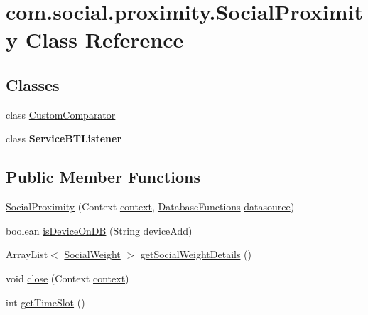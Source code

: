 \hypertarget{classcom_1_1social_1_1proximity_1_1_social_proximity}{}\section{com.\+social.\+proximity.\+Social\+Proximity Class Reference}
\label{classcom_1_1social_1_1proximity_1_1_social_proximity}
\subsection*{Classes}
\begin{DoxyCompactItemize}
\item 
class \hyperlink{classcom_1_1social_1_1proximity_1_1_social_proximity_1_1_custom_comparator}{Custom\+Comparator}
\item 
class {\bfseries Service\+B\+T\+Listener}
\end{DoxyCompactItemize}
\subsection*{Public Member Functions}
\begin{DoxyCompactItemize}
\item 
\hyperlink{classcom_1_1social_1_1proximity_1_1_social_proximity_aca9e6f96e31a9714fed5967a7710ad1e}{Social\+Proximity} (Context \hyperlink{classcom_1_1social_1_1proximity_1_1_social_proximity_a094349a2f8b31f6f13353abec962f0a4}{context}, \hyperlink{classcom_1_1social_1_1proximity_1_1_database_functions}{Database\+Functions} \hyperlink{classcom_1_1social_1_1proximity_1_1_social_proximity_ac36be388d1519a9c1ec298bcac0aa3f2}{datasource})
\item 
boolean \hyperlink{classcom_1_1social_1_1proximity_1_1_social_proximity_a5cd69f250d4aca9e436760ce078e762b}{is\+Device\+On\+D\+B} (String device\+Add)
\item 
Array\+List$<$ \hyperlink{classcom_1_1social_1_1proximity_1_1_social_weight}{Social\+Weight} $>$ \hyperlink{classcom_1_1social_1_1proximity_1_1_social_proximity_ae1acae13d8ea15aedcd8d7c758f45aef}{get\+Social\+Weight\+Details} ()
\item 
void \hyperlink{classcom_1_1social_1_1proximity_1_1_social_proximity_aeea1aa00b7a490fdf71eeb9cb68ab9dd}{close} (Context \hyperlink{classcom_1_1social_1_1proximity_1_1_social_proximity_a094349a2f8b31f6f13353abec962f0a4}{context})
\item 
int \hyperlink{classcom_1_1social_1_1proximity_1_1_social_proximity_a2f777f371e2f1b98c1f6d3d476ecd614}{get\+Time\+Slot} ()
\end{DoxyCompactItemize}
